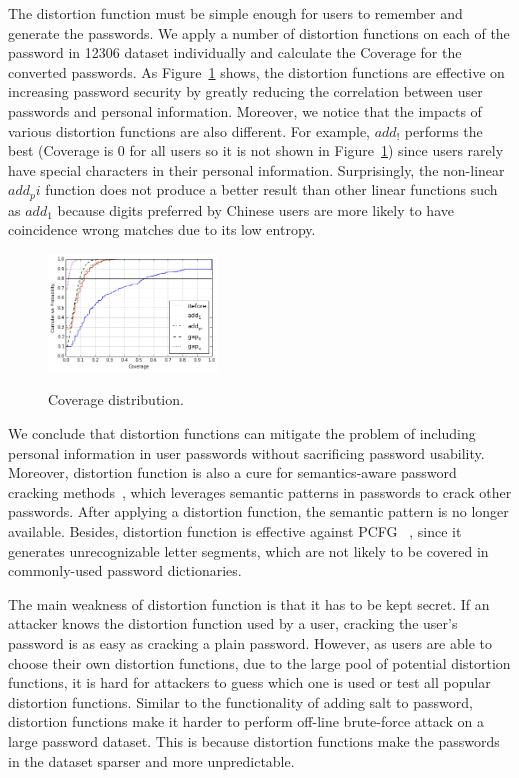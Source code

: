 The distortion function must be simple enough for users to remember
and generate the passwords. We apply a number of distortion functions
on each of the password in 12306 dataset individually and calculate
the Coverage for the converted passwords.  As Figure~\ref{f4} shows,
the distortion functions are effective on increasing password
security by greatly reducing the
correlation between user passwords and personal information.
%
Moreover, we notice that the impacts of various distortion functions
are also different. For example, {\em $add_!$} performs the best
(Coverage is 0 for all users so it is not shown in Figure~\ref{f4}) since users rarely have special
characters in their personal information. Surprisingly, the non-linear
{\em $add_pi$} function does not produce a better result than other
linear functions such as {\em $add_1$} because digits preferred by Chinese
users are more likely to have coincidence wrong matches due to its low entropy.
 \begin{figure}[t]
\centering
  \caption{Coverage distribution.}{}
  \label{f4}
    \includegraphics[width=0.4\textwidth]{fig/dist2}
\vspace{-0.1in}
\end{figure}

We conclude that distortion functions can mitigate the problem of
including personal information in user passwords without sacrificing
password usability.  Moreover, distortion function is also a cure for
semantics-aware password cracking methods~\cite{veras2014semantic},
which leverages semantic patterns in passwords to crack other
passwords. After applying a distortion function, the semantic pattern
is no longer available. Besides, distortion function is effective against PCFG
~\cite{weir2009password}, since it generates unrecognizable letter segments, which are not likely to be covered in commonly-used password
dictionaries.

The main weakness of distortion function is that it has to be kept
secret. If an attacker knows the distortion function used by a user,
cracking the user's password is as easy as cracking a plain
password. However, as users are able to choose their own distortion
functions, due to the large pool of potential distortion functions, it
is hard for attackers to guess which one is used or test all popular
distortion functions. Similar to the functionality of adding salt to
password, distortion functions make it harder to perform off-line
brute-force attack on a large password dataset. This is because
distortion functions make the passwords in the dataset sparser and
more unpredictable. 
 




